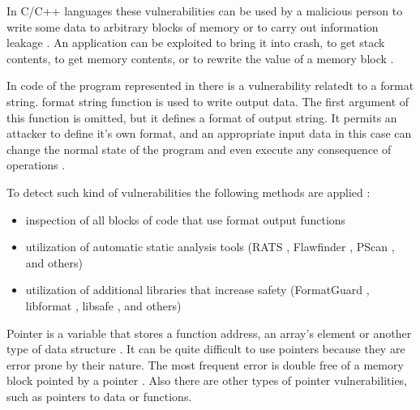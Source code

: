 %
In C/C++ languages these vulnerabilities can be used by a malicious person to write some data to arbitrary blocks of memory or to carry out information leakage . 
%
An application can be exploited to bring it into crash, to get stack contents, to get memory contents, or to rewrite the value of a memory block   . 

%
In code of the program represented in  there is a vulnerability relatedt to a format string. 
%
 format string function is used to write output data. 
%
The first argument of this function is omitted, but it defines a format of output string. 
%
It permits an attacker to define it's own format, and an appropriate input data in this case can change the normal state of the program and even execute any consequence of operations . 

%
To detect such kind of vulnerabilities the following methods are applied  : 
\begin{itemize}
	\item inspection of all blocks of code that use format output functions
	\item utilization of automatic static analysis tools (RATS , Flawfinder , PScan , and others) 
	\item utilization of additional libraries that increase safety (FormatGuard , libformat , libsafe , and others)
\end{itemize}



%
Pointer is a variable that stores a function address, an array's element or another type of data structure . 
%
It can be quite difficult to use pointers because they are error prone by their nature. 
%
The most frequent error is double free of a memory block pointed by a pointer . 
%
Also there are other types of pointer vulnerabilities, such as pointers to data or functions. 

